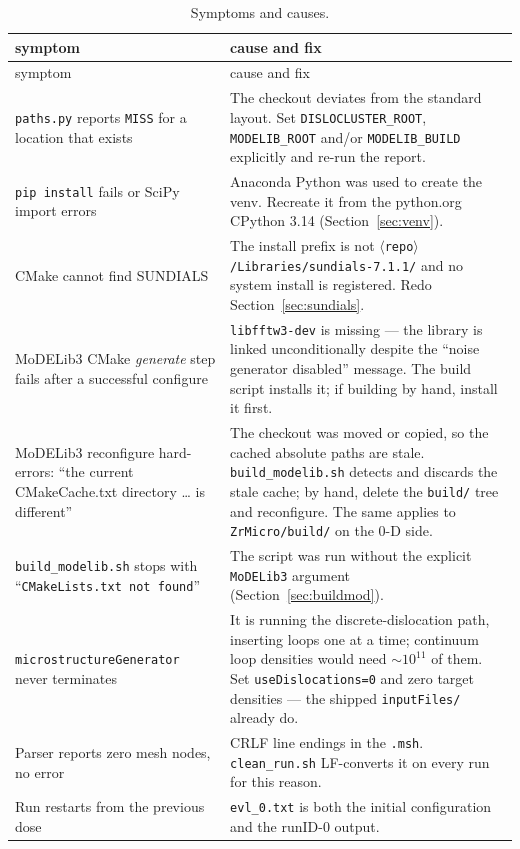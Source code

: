 \documentclass[11pt]{article}
\newcommand{\MoD}{\textsf{MoDELib3}}
\newcommand{\code}[1]{\texttt{\small #1}}
\newcommand{\file}[1]{\texttt{\footnotesize #1}}
\begin{document}
\begin{longtable}{@{}p{}p{}@{}}
\caption{Symptoms and causes.}
\label{tab:trouble}\\
\toprule
symptom & cause and fix \\
\midrule
\endfirsthead
\toprule
symptom & cause and fix \\
\midrule
\endhead
\code{paths.py} reports \code{MISS} for a location that exists &
The checkout deviates from the standard layout. Set
\code{DISLOCLUSTER\_ROOT}, \code{MODELIB\_ROOT} and/or \code{MODELIB\_BUILD}
explicitly and re-run the report. \\
\code{pip install} fails or SciPy import errors &
Anaconda Python was used to create the venv. Recreate it from the
python.org CPython 3.14 (Section~\ref{sec:venv}). \\
CMake cannot find SUNDIALS &
The install prefix is not
\file{$\langle$repo$\rangle$/Libraries/sundials-7.1.1/} and no system
install is registered. Redo Section~\ref{sec:sundials}. \\
\MoD{} CMake \emph{generate} step fails after a successful configure &
\code{libfftw3-dev} is missing --- the library is linked unconditionally
despite the ``noise generator disabled'' message. The build script installs
it; if building by hand, install it first. \\
\MoD{} reconfigure hard-errors: ``the current CMakeCache.txt directory
\ldots{} is different'' &
The checkout was moved or copied, so the cached absolute paths are stale.
\file{build\_modelib.sh} detects and discards the stale cache; by hand,
delete the \file{build/} tree and reconfigure. The same applies to
\file{ZrMicro/build/} on the 0-D side. \\
\file{build\_modelib.sh} stops with ``\code{CMakeLists.txt not found}'' &
The script was run without the explicit \file{MoDELib3} argument
(Section~\ref{sec:buildmod}). \\
\code{microstructureGenerator} never terminates &
It is running the discrete-dislocation path, inserting loops one at a time;
continuum loop densities would need $\sim 10^{11}$ of them. Set
\code{useDislocations=0} and zero target densities --- the shipped
\file{inputFiles/} already do. \\
Parser reports zero mesh nodes, no error &
CRLF line endings in the \file{.msh}. \file{clean\_run.sh} LF-converts it on
every run for this reason. \\
Run restarts from the previous dose &
\file{evl\_0.txt} is both the initial configuration and the runID-0 output.

\end{longtable}
\end{document}
